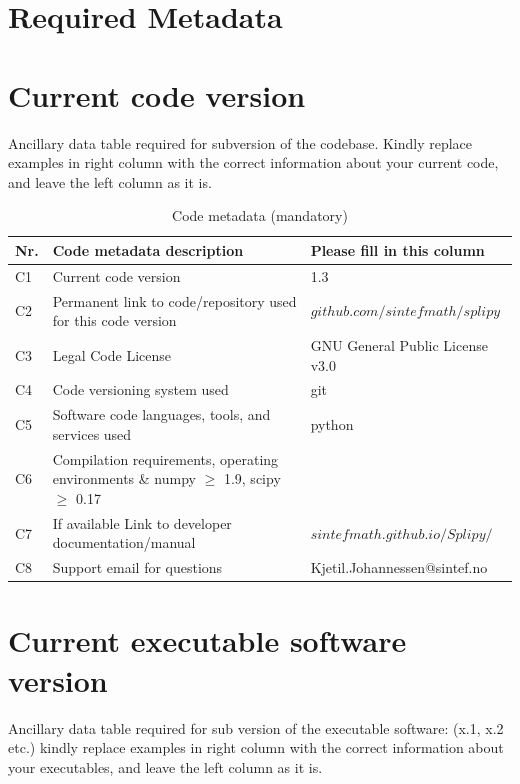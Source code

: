 \documentclass[preprint,12pt, a4paper]{elsarticle}
\begin{document}

{}







\section*{Required Metadata}
\label{}

\section*{Current code version}
\label{}

Ancillary data table required for subversion of the codebase. Kindly replace examples in right column with the correct information about your current code, and leave the left column as it is.

\begin{table}[!h]
\begin{tabular}{|l|p{6.5cm}|p{6.5cm}|}
\hline
\textbf{Nr.} & \textbf{Code metadata description} & \textbf{Please fill in this column} \\
\hline
C1 & Current code version & 1.3 \\
\hline
C2 & Permanent link to code/repository used for this code version & $github.com/sintefmath/splipy$ \\
\hline
C3 & Legal Code License   & GNU General Public License v3.0  \\
\hline
C4 & Code versioning system used & git \\
\hline
C5 & Software code languages, tools, and services used & python \\
\hline
C6 & Compilation requirements, operating environments \& numpy $\geq$ 1.9, scipy $\geq$ 0.17 \\
\hline
C7 & If available Link to developer documentation/manual & $sintefmath.github.io/Splipy/$ \\
\hline
C8 & Support email for questions & Kjetil.Johannessen@sintef.no \\
\hline
\end{tabular}
\caption{Code metadata (mandatory)}
\label{} 
\end{table}

\section*{Current executable software version}
\label{}

Ancillary data table required for sub version of the executable software: (x.1, x.2 etc.) kindly replace examples in right column with the correct information about your executables, and leave the left column as it is.
\end{document}
